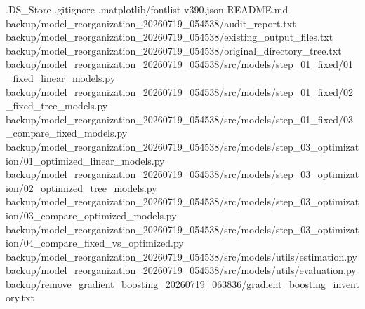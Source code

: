 \documentclass[
  11pt,
  a4paper]{article}
\newenvironment{Shaded}{}{}
\newcommand{\NormalTok}[1]{#1}
\begin{document}
\begin{Shaded}
\begin{Highlighting}[]
\NormalTok{.DS\_\allowbreak{}Store}
\NormalTok{.gitignore}
\NormalTok{.matplotlib/fontlist{-}v390.json}
\NormalTok{README.md}
\NormalTok{backup/model\_\allowbreak{}reorganization\_\allowbreak{}20260719\_\allowbreak{}054538/audit\_\allowbreak{}report.txt}
\NormalTok{backup/model\_\allowbreak{}reorganization\_\allowbreak{}20260719\_\allowbreak{}054538/existing\_\allowbreak{}output\_\allowbreak{}files.txt}
\NormalTok{backup/model\_\allowbreak{}reorganization\_\allowbreak{}20260719\_\allowbreak{}054538/original\_\allowbreak{}directory\_\allowbreak{}tree.txt}
\NormalTok{backup/model\_\allowbreak{}reorganization\_\allowbreak{}20260719\_\allowbreak{}054538/src/models/step\_\allowbreak{}01\_\allowbreak{}fixed/01\_\allowbreak{}fixed\_\allowbreak{}linear\_\allowbreak{}models.py}
\NormalTok{backup/model\_\allowbreak{}reorganization\_\allowbreak{}20260719\_\allowbreak{}054538/src/models/step\_\allowbreak{}01\_\allowbreak{}fixed/02\_\allowbreak{}fixed\_\allowbreak{}tree\_\allowbreak{}models.py}
\NormalTok{backup/model\_\allowbreak{}reorganization\_\allowbreak{}20260719\_\allowbreak{}054538/src/models/step\_\allowbreak{}01\_\allowbreak{}fixed/03\_\allowbreak{}compare\_\allowbreak{}fixed\_\allowbreak{}models.py}
\NormalTok{backup/model\_\allowbreak{}reorganization\_\allowbreak{}20260719\_\allowbreak{}054538/src/models/step\_\allowbreak{}03\_\allowbreak{}optimization/01\_\allowbreak{}optimized\_\allowbreak{}linear\_\allowbreak{}models.py}
\NormalTok{backup/model\_\allowbreak{}reorganization\_\allowbreak{}20260719\_\allowbreak{}054538/src/models/step\_\allowbreak{}03\_\allowbreak{}optimization/02\_\allowbreak{}optimized\_\allowbreak{}tree\_\allowbreak{}models.py}
\NormalTok{backup/model\_\allowbreak{}reorganization\_\allowbreak{}20260719\_\allowbreak{}054538/src/models/step\_\allowbreak{}03\_\allowbreak{}optimization/03\_\allowbreak{}compare\_\allowbreak{}optimized\_\allowbreak{}models.py}
\NormalTok{backup/model\_\allowbreak{}reorganization\_\allowbreak{}20260719\_\allowbreak{}054538/src/models/step\_\allowbreak{}03\_\allowbreak{}optimization/04\_\allowbreak{}compare\_\allowbreak{}fixed\_\allowbreak{}vs\_\allowbreak{}optimized.py}
\NormalTok{backup/model\_\allowbreak{}reorganization\_\allowbreak{}20260719\_\allowbreak{}054538/src/models/utils/estimation.py}
\NormalTok{backup/model\_\allowbreak{}reorganization\_\allowbreak{}20260719\_\allowbreak{}054538/src/models/utils/evaluation.py}
\NormalTok{backup/remove\_\allowbreak{}gradient\_\allowbreak{}boosting\_\allowbreak{}20260719\_\allowbreak{}063836/gradient\_\allowbreak{}boosting\_\allowbreak{}inventory.txt}

\end{Highlighting}
\end{Shaded}
\end{document}

